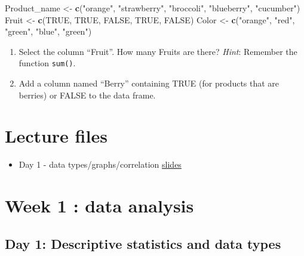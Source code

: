 \documentclass[
]{book}
\newenvironment{Shaded}{\begin{snugshade}}{\end{snugshade}}
\newcommand{\ConstantTok}[1]{\textcolor[rgb]{0.56,0.35,0.01}{#1}}
\newcommand{\FunctionTok}[1]{\textcolor[rgb]{0.13,0.29,0.53}{\textbf{#1}}}
\newcommand{\NormalTok}[1]{#1}
\newcommand{\OtherTok}[1]{\textcolor[rgb]{0.56,0.35,0.01}{#1}}
\newcommand{\StringTok}[1]{\textcolor[rgb]{0.31,0.60,0.02}{#1}}
\providecommand{\tightlist}{%
  \setlength{\itemsep}{0pt}\setlength{\parskip}{0pt}}
\begin{document}
\begin{Shaded}
\begin{Highlighting}[]
\NormalTok{Product\_name }\OtherTok{\textless{}{-}} \FunctionTok{c}\NormalTok{(}\StringTok{"orange"}\NormalTok{, }\StringTok{"strawberry"}\NormalTok{, }\StringTok{"broccoli"}\NormalTok{, }\StringTok{"blueberry"}\NormalTok{, }\StringTok{"cucumber"}\NormalTok{)}
\NormalTok{Fruit }\OtherTok{\textless{}{-}} \FunctionTok{c}\NormalTok{(}\ConstantTok{TRUE}\NormalTok{, }\ConstantTok{TRUE}\NormalTok{, }\ConstantTok{FALSE}\NormalTok{, }\ConstantTok{TRUE}\NormalTok{, }\ConstantTok{FALSE}\NormalTok{)}
\NormalTok{Color }\OtherTok{\textless{}{-}} \FunctionTok{c}\NormalTok{(}\StringTok{"orange"}\NormalTok{, }\StringTok{"red"}\NormalTok{, }\StringTok{"green"}\NormalTok{, }\StringTok{"blue"}\NormalTok{, }\StringTok{"green"}\NormalTok{)}
\end{Highlighting}
\end{Shaded}

\begin{enumerate}
\def\labelenumi{\arabic{enumi}.}
\setcounter{enumi}{1}
\item
  Select the column ``Fruit''.
  How many Fruits are there?
  \emph{Hint}: Remember the function \texttt{sum()}.
\item
  Add a column named ``Berry'' containing TRUE (for products that are berries) or FALSE to the data frame.
\end{enumerate}

\hypertarget{lecture-files}{%
\chapter{Lecture files}\label{lecture-files}}

\begin{itemize}
\tightlist
\item
  Day 1 - data types/graphs/correlation \href{./slides/GKBioinfo_week1_day1.pdf}{slides}
\end{itemize}

\hypertarget{week-1-data-analysis}{%
\chapter*{Week 1 : data analysis}\label{week-1-data-analysis}}

\hypertarget{day-1-descriptive-statistics-and-data-types}{%
\section*{Day 1: Descriptive statistics and data types}\label{day-1-descriptive-statistics-and-data-types}}
\end{document}
